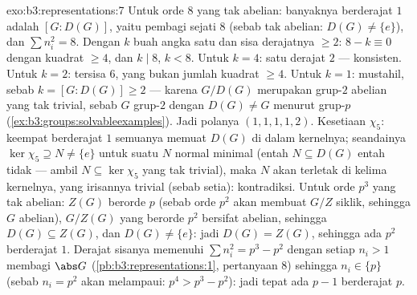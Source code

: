 \begin{solution}{exo:b3:representations:7}
Untuk orde $8$ yang tak abelian: banyaknya  berderajat $1$ adalah
$[G : D(G)]$, yaitu pembagi sejati $8$ (sebab tak abelian: $D(G) \neq
\{e\}$), dan $\sum n_i^2 = 8$. Dengan $k$ buah angka satu dan sisa
derajatnya $\geq 2$: $8 - k \equiv 0$ dengan kuadrat $\geq 4$, dan $k
\mid 8$, $k < 8$. Untuk $k = 4$: satu derajat $2$ --- konsisten. Untuk $k =
2$: tersisa $6$, yang bukan jumlah kuadrat $\geq 4$. Untuk $k = 1$:
mustahil, sebab $k = [G : D(G)] \geq 2$ --- karena $G/D(G)$ merupakan
grup-$2$ abelian yang tak trivial, sebab $G$ grup-$2$ dengan
$D(G) \neq G$ menurut  grup-$p$
(\cref{ex:b3:groups:solvableexamples}). Jadi polanya
$(1,1,1,1,2)$. Kesetiaan $\chi_5$: keempat  berderajat $1$
semuanya memuat $D(G)$ di dalam kernelnya; seandainya $\ker\chi_5
\supseteq N \neq \{e\}$ untuk suatu $N$ normal minimal (entah $N
\subseteq D(G)$ entah tidak --- ambil $N \subseteq \ker\chi_5$
yang tak trivial), maka $N$ akan terletak di kelima kernelnya, yang
irisannya trivial (sebab 
setia): kontradiksi. Untuk orde $p^3$ yang tak abelian: $Z(G)$
berorde $p$ (sebab orde $p^2$ akan membuat $G/Z$ siklik, sehingga $G$ abelian),
$G/Z(G)$ yang berorde $p^2$ bersifat abelian, sehingga $D(G) \subseteq Z(G)$,
dan $D(G) \ne \{e\}$: jadi $D(G) = Z(G)$, sehingga ada $p^2$ 
berderajat $1$. Derajat sisanya memenuhi $\sum n_i^2 = p^3 -
p^2$ dengan setiap $n_i > 1$ membagi $\abs G$
(\cref{pb:b3:representations:1}, pertanyaan 8) sehingga $n_i \in
\{p\}$ (sebab $n_i = p^2$ akan melampaui: $p^4 > p^3 - p^2$): jadi tepat ada $p
- 1$  berderajat $p$.
\end{solution}

